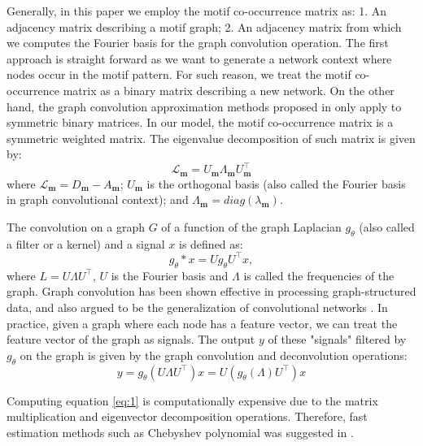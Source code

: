 \documentclass{article}
\theoremstyle{definition}
\begin{document}
Generally, in this paper we employ the motif co-occurrence matrix
as: 1. An adjacency matrix describing a motif graph; 2. An adjacency
matrix from which we computes the Fourier basis for the graph convolution
operation. The first approach is straight forward as we want to generate
a network context where nodes occur in the motif pattern. For such reason,
we treat the motif co-occurrence matrix as a binary matrix describing a new
network. On the other hand, the graph convolution approximation methods 
proposed in \cite{gcn,defferrard2016convolutional} only apply to symmetric 
binary matrices. In our model, the motif co-occurrence matrix is a symmetric 
weighted matrix. The eigenvalue decomposition of such matrix is given by:
\begin{equation} \label{eq:eigm}
\mathcal{L}_{\mathbf{m}} = U_{\mathbf{m}} \Lambda_{\mathbf{m}} U^{\top}_{\mathbf{m}}
\end{equation}
where $\mathcal{L}_{\mathbf{m}} = D_{\mathbf{m}} - A_{\mathbf{m}}$; $U_{\mathbf{m}}$ is the
orthogonal basis (also called the Fourier basis in graph convolutional context);
and $\Lambda_{\mathbf{m}} = diag(\lambda_{\mathbf{m}})$. 

The convolution on a graph $G$ of a function of the graph 
Laplacian $g_{\theta}$ (also called a filter or a kernel) 
and a signal $x$ is defined as:
$$g_{\theta} \ast x = U g_{\theta} U^{\top} x,$$
where $L = U \Lambda U^\top$, $U$ is the Fourier basis
and $\Lambda$ is called the frequencies of the graph. 
Graph convolution has been shown effective in processing
graph-structured data, and also argued to be the generalization
of convolutional networks \cite{shuman2013emerging,defferrard2016convolutional,gcn}.
In practice, given a graph where each node has a feature vector,
we can treat the feature vector of the graph as signals. The output $y$
of these "signals" filtered by $g_\theta$ on the graph is given by
the graph convolution and deconvolution operations: 
\begin{equation}
\label{eq:1}
y = g_\theta (U \Lambda U^\top) x = U (g_\theta(\Lambda) U^\top)x
\end{equation}

Computing equation \ref{eq:1} is computationally expensive
due to the matrix multiplication and eigenvector decomposition operations.
Therefore, fast estimation methods such as Chebyshev polynomial was suggested
in \cite{hammond2011wavelets}.
\end{document}
